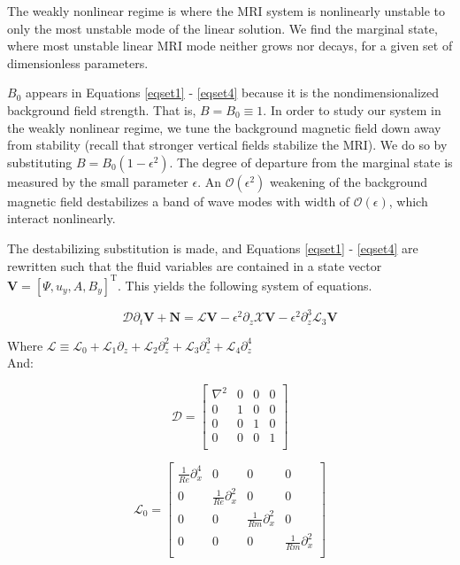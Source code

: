 \documentclass{emulateapj}
\newcommand{\beq}{\begin{equation}}
\newcommand{\eeq}{\end{equation}}
\newcommand\reye{\mathrel{Re}}
\newcommand\reym{\mathrel{Rm}}
\begin{document}
The weakly nonlinear regime is where the MRI system is nonlinearly unstable to only the most unstable mode of the linear solution. We find the marginal state, where most unstable linear MRI mode neither grows nor decays, for a given set of dimensionless parameters. 

$B_0$ appears in Equations \ref{eqset1} - \ref{eqset4} because it is the nondimensionalized background field strength. That is, $B = B_0 \equiv 1$. In order to study our system in the weakly nonlinear regime, we tune the background magnetic field down away from stability (recall that stronger vertical fields stabilize the MRI). We do so by substituting $B = B_0\left(1 - \epsilon^2\right)$. The degree of departure from the marginal state is measured by the small parameter $\epsilon$. An $\mathcal{O}\left(\epsilon^2\right)$ weakening of the background magnetic field destabilizes a band of wave modes with width of $\mathcal{O}\left(\epsilon\right)$, which interact nonlinearly.

The destabilizing substitution is made, and Equations \ref{eqset1} - \ref{eqset4} are rewritten such that the fluid variables are contained in a state vector $\mathbf{V} = \left[\Psi, u_y, A, B_y\right]^\mathrm{T}$. This yields the following system of equations.

\beq
\mathcal{D}\partial_t \mathbf{V} + \mathbf{N} = \mathcal{L} \mathbf{V} - \epsilon^2\partial_z\mathcal{X} \mathbf{V} - \epsilon^2 \partial_z^3 \mathcal{L}_3\mathbf{V}
\eeq

Where $\mathcal{L} \equiv \mathcal{L}_0 + \mathcal{L}_1\partial_z + \mathcal{L}_2\partial_z^2 + \mathcal{L}_3\partial_z^3 + \mathcal{L}_4\partial_z^4$ \\

And:

\beq
\mathcal{D} = \left[\begin{matrix}
\nabla^2 & 0 & 0 & 0 \\
0 & 1& 0 & 0 \\
0 & 0 & 1 & 0\\
0 & 0 & 0 & 1 \\
\end{matrix}\right]
\eeq

\beq
\mathcal{L}_0 = \left[\begin{matrix}
\frac{1}{\reye}\partial_x^4 & 0 & 0 & 0 \\
0 & \frac{1}{\reye}\partial_x^2 & 0 &0 \\
0 & 0 & \frac{1}{\reym}\partial_x^2 & 0 \\
0 & 0 & 0 & \frac{1}{\reym}\partial_x^2 \\ \end{matrix}\right]
\eeq
\end{document}
